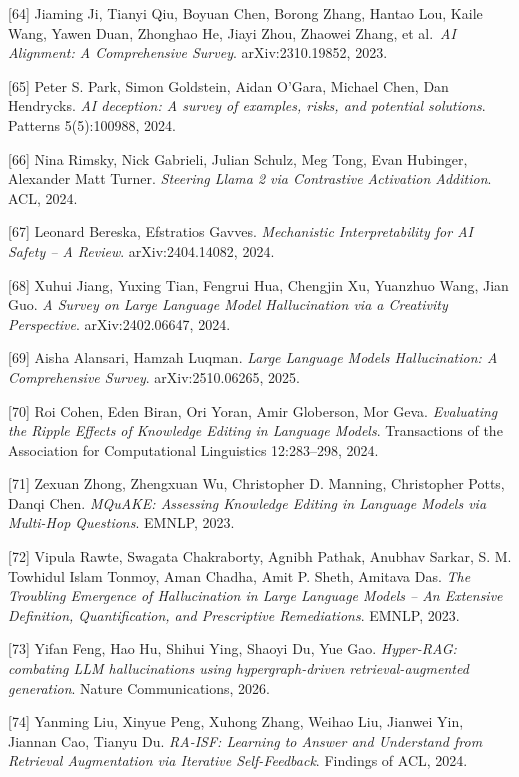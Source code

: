 {[}64{]} Jiaming Ji, Tianyi Qiu, Boyuan Chen, Borong Zhang, Hantao Lou, Kaile Wang, Yawen Duan, Zhonghao He, Jiayi Zhou, Zhaowei Zhang, et al.~\emph{AI Alignment: A Comprehensive Survey}. arXiv:2310.19852, 2023.

{[}65{]} Peter S. Park, Simon Goldstein, Aidan O'Gara, Michael Chen, Dan Hendrycks. \emph{AI deception: A survey of examples, risks, and potential solutions}. Patterns 5(5):100988, 2024.

{[}66{]} Nina Rimsky, Nick Gabrieli, Julian Schulz, Meg Tong, Evan Hubinger, Alexander Matt Turner. \emph{Steering Llama 2 via Contrastive Activation Addition}. ACL, 2024.

{[}67{]} Leonard Bereska, Efstratios Gavves. \emph{Mechanistic Interpretability for AI Safety -- A Review}. arXiv:2404.14082, 2024.

{[}68{]} Xuhui Jiang, Yuxing Tian, Fengrui Hua, Chengjin Xu, Yuanzhuo Wang, Jian Guo. \emph{A Survey on Large Language Model Hallucination via a Creativity Perspective}. arXiv:2402.06647, 2024.

{[}69{]} Aisha Alansari, Hamzah Luqman. \emph{Large Language Models Hallucination: A Comprehensive Survey}. arXiv:2510.06265, 2025.

{[}70{]} Roi Cohen, Eden Biran, Ori Yoran, Amir Globerson, Mor Geva. \emph{Evaluating the Ripple Effects of Knowledge Editing in Language Models}. Transactions of the Association for Computational Linguistics 12:283--298, 2024.

{[}71{]} Zexuan Zhong, Zhengxuan Wu, Christopher D. Manning, Christopher Potts, Danqi Chen. \emph{MQuAKE: Assessing Knowledge Editing in Language Models via Multi-Hop Questions}. EMNLP, 2023.

{[}72{]} Vipula Rawte, Swagata Chakraborty, Agnibh Pathak, Anubhav Sarkar, S. M. Towhidul Islam Tonmoy, Aman Chadha, Amit P. Sheth, Amitava Das. \emph{The Troubling Emergence of Hallucination in Large Language Models -- An Extensive Definition, Quantification, and Prescriptive Remediations}. EMNLP, 2023.

{[}73{]} Yifan Feng, Hao Hu, Shihui Ying, Shaoyi Du, Yue Gao. \emph{Hyper-RAG: combating LLM hallucinations using hypergraph-driven retrieval-augmented generation}. Nature Communications, 2026.

{[}74{]} Yanming Liu, Xinyue Peng, Xuhong Zhang, Weihao Liu, Jianwei Yin, Jiannan Cao, Tianyu Du. \emph{RA-ISF: Learning to Answer and Understand from Retrieval Augmentation via Iterative Self-Feedback}. Findings of ACL, 2024.

